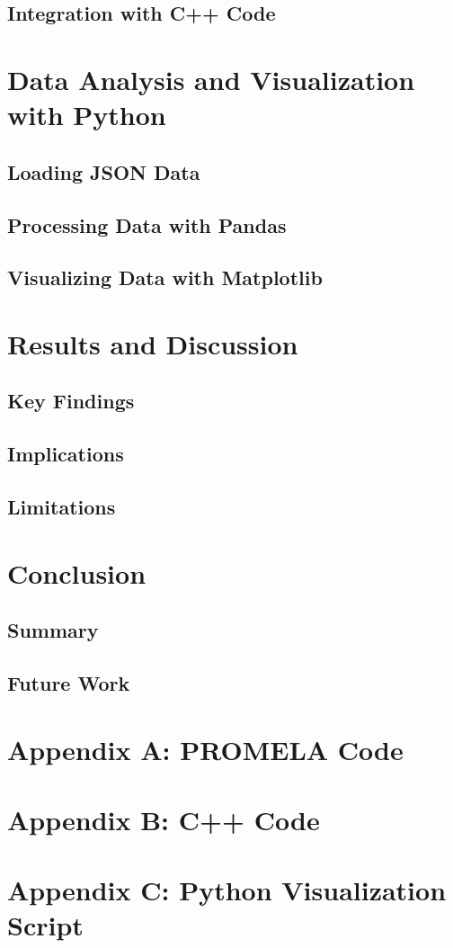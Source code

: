 \documentclass[12pt]{report}
\begin{document}
\section{Integration with C++ Code}

\chapter{Data Analysis and Visualization with Python}
\section{Loading JSON Data}
\section{Processing Data with Pandas}
\section{Visualizing Data with Matplotlib}

\chapter{Results and Discussion}
\section{Key Findings}
\section{Implications}
\section{Limitations}

\chapter{Conclusion}
\section{Summary}
\section{Future Work}

\appendix
\chapter{Appendix A: PROMELA Code}
\chapter{Appendix B: C++ Code}
\chapter{Appendix C: Python Visualization Script}
\end{document}

